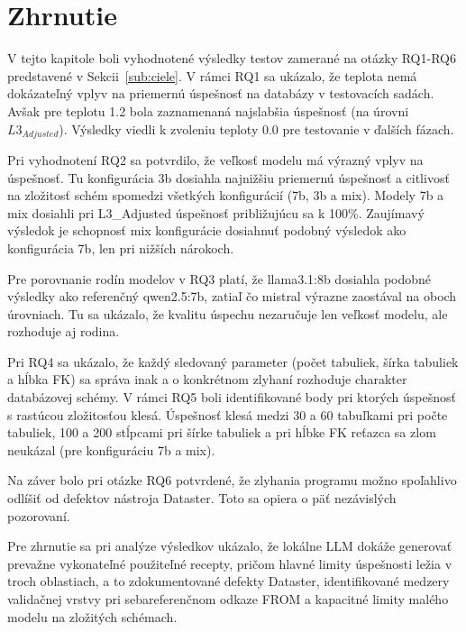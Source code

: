 \section{Zhrnutie}

V tejto kapitole boli vyhodnotené výsledky testov zamerané na otázky RQ1-RQ6 predstavené v Sekcii~\ref{sub:ciele}. V rámci RQ1 sa ukázalo, že teplota nemá dokázateľný vplyv na priemernú úspešnosť na databázy v testovacích sadách. Avšak pre teplotu 1.2 bola zaznamenaná najslabšia úspešnosť (na úrovni $L3_{Adjusted}$). Výsledky viedli k zvoleniu teploty 0.0 pre testovanie v ďalších fázach. 


Pri vyhodnotení RQ2 sa potvrdilo, že veľkosť modelu má výrazný vplyv na úspešnosť.  Tu konfigurácia 3b dosiahla najnižšiu priemernú úspešnosť a citlivosť na zložitosť schém spomedzi všetkých konfigurácií (7b, 3b a mix). Modely 7b a mix dosiahli pri L3\_Adjusted úspešnosť približujúcu sa k 100\%. Zaujímavý výsledok je schopnosť mix konfigurácie dosiahnuť podobný výsledok ako konfigurácia 7b, len pri nižších nárokoch.


Pre porovnanie rodín modelov v RQ3 platí, že llama3.1:8b dosiahla podobné výsledky ako referenčný qwen2.5:7b, zatiaľ čo mistral výrazne zaostával na oboch úrovniach. Tu sa ukázalo, že kvalitu úspechu nezaručuje len veľkosť modelu, ale rozhoduje aj rodina.


Pri RQ4 sa ukázalo, že každý sledovaný parameter (počet tabuliek, šírka tabuliek a hĺbka FK) sa správa inak a o konkrétnom zlyhaní rozhoduje charakter databázovej schémy. V rámci RQ5 boli identifikované body pri ktorých úspešnosť s rastúcou zložitosťou klesá. Úspešnosť klesá medzi 30 a 60 tabuľkami pri počte tabuliek, 100 a 200 stĺpcami pri šírke tabuliek a pri hĺbke FK reťazca sa zlom neukázal (pre konfiguráciu 7b a mix).


Na záver bolo pri otázke RQ6 potvrdené, že zlyhania programu možno spoľahlivo odlíšiť od defektov nástroja Dataster. Toto sa opiera o päť nezávislých pozorovaní.


Pre zhrnutie sa pri analýze výsledkov ukázalo, že lokálne LLM dokáže generovať prevažne vykonateľné použiteľné recepty, pričom hlavné limity úspešnosti ležia v troch oblastiach, a to zdokumentované defekty Dataster, identifikované medzery validačnej vrstvy pri sebareferenčnom odkaze FROM a kapacitné limity malého modelu na zložitých schémach.